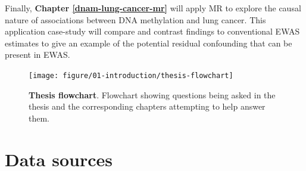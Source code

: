 \documentclass[11pt,oneside]{bristolthesis}
\newcommand{\blandscape}{\begin{landscape}}
\newcommand{\elandscape}{\end{landscape}}
\begin{document}
Finally, \textbf{Chapter \ref{dnam-lung-cancer-mr}} will apply MR to explore the causal nature of associations between DNA methylation and lung cancer. This application case-study will compare and contrast findings to conventional EWAS estimates to give an example of the potential residual confounding that can be present in EWAS.





\blandscape
\begin{figure}[htbp]

{\centering \texttt{[image: figure/01-introduction/thesis-flowchart]} 

}

\caption[Thesis flowchart]{\textbf{Thesis flowchart}. Flowchart showing questions being asked in the thesis and the corresponding chapters attempting to help answer them.}\label{fig:thesis-flowchart}
\end{figure}
\elandscape

\hypertarget{data-sources}{%
\chapter{Data sources}\label{data-sources}}
\end{document}

